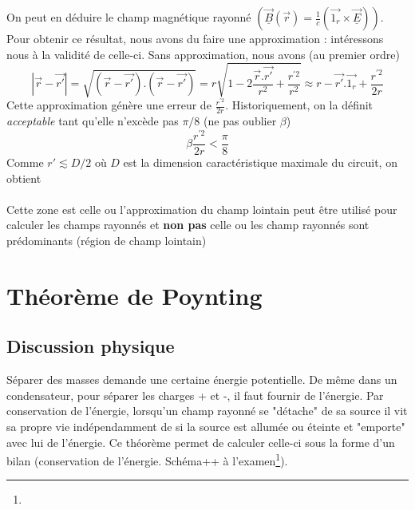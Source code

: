 	On peut en déduire le champ magnétique rayonné $\left(\underline{\vec{B}}(\vec{r}) = 
	\frac{1}{c}\left(\vec{1_r}\times\underline{\vec{E}}\right)\right)$. Pour obtenir ce résultat, 
	nous avons du faire une approximation : intéressons nous à la validité de celle-ci. Sans 
	approximation, nous avons (au premier ordre)
	\begin{equation}
	|\vec{r}-\vec{r'}| = \sqrt{(\vec{r}-\vec{r'}).(\vec{r}-\vec{r'})} = r\sqrt{1-2\frac{\vec{r}.
	\vec{r'}}{r^2}+\frac{r^{'2}}{r^2}} \approx r-\vec{r'}.\vec{1_r}+\frac{r^{'2}}{2r}
	\end{equation}
	Cette approximation génère une erreur de $\frac{r^{'2}}{2r}$. Historiquement, on la définit 
	\textit{acceptable} tant qu'elle n'excède pas $\pi/8$ (\danger ne pas oublier $\beta$)
	\begin{equation}
	\beta\frac{r^{'2}}{2r} < \frac{\pi}{8}
	\end{equation}
	Comme $r'\lesssim D/2$ où $D$ est la dimension caractéristique maximale du circuit, on obtient\\
	\ \\
	
	\danger Cette zone est celle ou l'approximation du champ lointain peut être utilisé pour 
	calculer les champs rayonnés et \textbf{non pas} celle ou les champ rayonnés sont prédominants 
	(région de champ lointain)
	
\section{Théorème de Poynting}
	\subsection{Discussion physique}
Séparer des masses demande une certaine énergie potentielle. De même dans un condensateur, pour 
séparer les charges + et -, il faut fournir de l'énergie. Par conservation de l'énergie, lorsqu'un 
champ rayonné se "détache" de sa source il vit sa propre vie indépendamment de si la source est 
allumée ou éteinte et "emporte" avec lui de l'énergie. Ce théorème permet de calculer celle-ci sous 
la forme d'un bilan (conservation de l'énergie. Schéma++ à l'examen\footnote{}).\\

